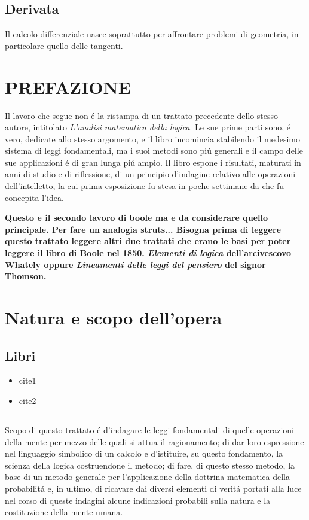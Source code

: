\section{Derivata}
Il calcolo differenziale nasce soprattutto per affrontare problemi di geometria, in particolare quello delle tangenti.




\chapter*{PREFAZIONE}
Il lavoro che segue non \'{e} la ristampa di un trattato precedente dello stesso autore, intitolato \textit{L'analisi matematica della logica}. Le sue prime parti sono, \'{e} vero,
dedicate allo stesso argomento, e il libro incomincia stabilendo il medesimo sistema di leggi fondamentali, ma i suoi metodi sono pi\'{u} generali e il campo delle sue applicazioni
\'{e} di gran lunga pi\'{u} ampio. Il libro espone i risultati, maturati in anni di studio e di riflessione, di un principio d'indagine relativo alle operazioni dell'intelletto, la cui
prima esposizione fu stesa in poche settimane da che fu concepita l'idea.

\textbf{Questo e il secondo lavoro di boole ma e da considerare quello principale. Per fare un analogia struts... Bisogna prima di leggere questo trattato
  leggere altri due trattati che erano le basi per poter leggere il libro di Boole nel 1850.  
  \textit{Elementi di logica} dell'arcivescovo Whately oppure \textit{Lineamenti delle leggi del pensiero} del signor Thomson.
}

\chapter{Natura e scopo dell'opera}\section{Libri}
  \begin{itemize}
   \item cite{1}
   \item cite{2}
  \end{itemize}
\section{}
Scopo di questo trattato \'{e} d'indagare le leggi fondamentali di quelle operazioni della mente per mezzo delle quali si attua il ragionamento; di dar loro espressione nel linguaggio
simbolico di un calcolo e d'istituire, su questo fondamento, la scienza della logica costruendone il metodo; di fare, di questo stesso metodo, la base di un metodo generale per
l'applicazione della dottrina matematica della probabilit\'{a} e, in ultimo, di ricavare dai diversi elementi di verit\'{a} portati alla luce nel corso di queste indagini alcune
indicazioni probabili sulla natura e la costituzione della mente umana.

